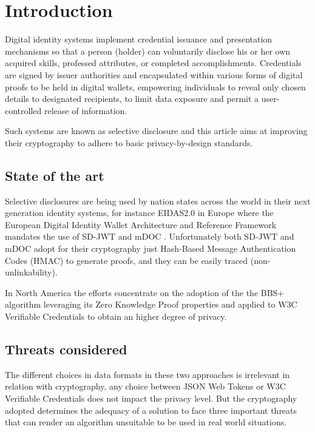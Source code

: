 \section{Introduction}
Digital identity systems implement credential issuance and presentation mechanisms so that a person (holder) can voluntarily disclose his or her own acquired skills, professed attributes, or completed accomplishments. Credentials are signed by issuer authorities and encapsulated within various forms of digital proofs to be held in digital wallets, empowering individuals to reveal only chosen details to designated recipients, to limit data exposure and permit a user-controlled release of information.

Such systems are known as selective disclosure and this article aims at improving their cryptography to adhere to basic privacy-by-design standards.

\subsection{State of the art}

Selective disclosures are being used by nation states across the world in their next generation identity systems, for instance EIDAS2.0 in Europe where the European Digital Identity Wallet Architecture and Reference Framework\cite{eudi-arf} mandates the use of SD-JWT\cite{sd-jwt} and mDOC \cite{mdoc}. Unfortunately both SD-JWT and mDOC adopt for their cryptography just Hash-Based Message Authentication Codes (HMAC) to generate proofs, and they can be easily traced (non-unlinkability).

In North America the efforts concentrate on the adoption of the the BBS+ algorithm\cite{bbs+} leveraging its Zero Knowledge Proof properties and applied to W3C Verifiable Credentials\cite{w3c-vc} to obtain an higher degree of privacy.

\subsection{Threats considered}

The different choices in data formats in these two approaches is irrelevant in relation with cryptography, any choice between JSON Web Tokens or W3C Verifiable Credentials does not impact the privacy level. But the cryptography adopted determines the adequacy of a solution to face three important threats that can render an algorithm unsuitable to be used in real world situations.

